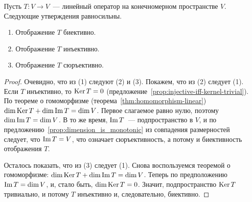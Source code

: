 \begin{proposition}\label{prop:operators-bij-inj-surj}
Пусть $T\colon V\to V$~--- линейный оператор на конечномерном пространстве $V$.
Следующие утверждения равносильны.
\begin{enumerate}
\item Отображение $T$ биективно.
\item Отображение $T$ инъективно.
\item Отображение $T$ сюръективно.
\end{enumerate}
\end{proposition}
\begin{proof}
Очевидно, что из (1) следуют (2) и (3). Покажем, что из (2) следует (1).
Если $T$ инъективно, то $\operatorname{Ker} T=0$ (предложение~\ref{prop:injective-iff-kernel-trivial}).
По теореме о гомоморфизме (теорема~\ref{thm:homomorphism-linear})
$\dim\operatorname{Ker} T + \dim\operatorname{Im} T = \dim V$. Первое слагаемое равно нулю, поэтому
$\dim\operatorname{Im} T = \dim V$. В то же время, $\operatorname{Im} T$~--- подпространство в $V$,
и по предложению~\ref{prop:dimension_is_monotonic} из совпадения размерностей
следует, что $\operatorname{Im} T = V$, что означает сюръективность, а потому и биективность
отображения $T$.

Осталось показать, что из (3) следует (1). Снова воспользуемся теоремой о гомоморфизме:
$\dim\operatorname{Ker} T + \dim\operatorname{Im} T = \dim V$. Теперь по предположению $\operatorname{Im} T = \dim V$, и,
стало быть, $\dim\operatorname{Ker} T=0$. Значит, подпространство $\operatorname{Ker} T$ тривиально, и потому
$T$ инъективно и, следовательно, биективно.
\end{proof}

